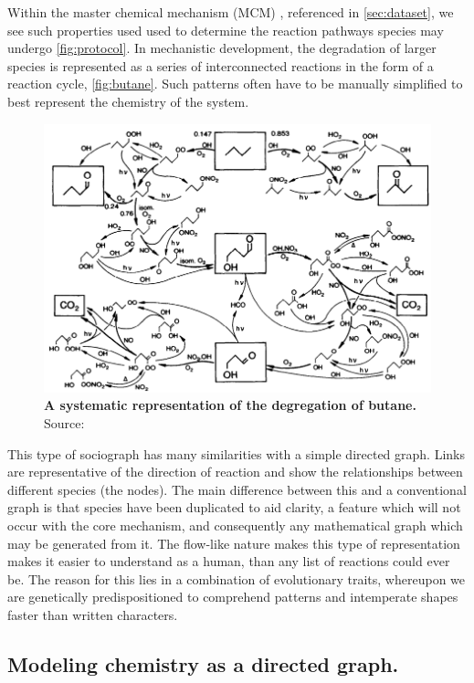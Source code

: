 Within the master chemical mechanism (MCM) \cite{mcm}, referenced in \autoref{sec:dataset}, we see such properties used used to determine the reaction pathways species may undergo \autoref{fig:protocol}. In mechanistic development, the degradation of larger species is represented as a series of interconnected reactions in the form of a reaction cycle, \autoref{fig:butane}. Such patterns often have to be manually simplified to best represent the chemistry of the system. 

\begin{figure}[H]
    \centering
        \includegraphics[width=\textwidth]{figures_c1/butane.png}

       \caption{\textbf{A systematic representation of the degregation of butane.} Source: \cite{butane} }
       \label{fig:butane}
\end{figure}

This type of sociograph has many similarities with a simple directed graph. Links are representative of the direction of reaction and show the relationships between different species (the nodes). The main difference between this and a conventional graph is that species have been duplicated to aid clarity, a feature which will not occur with the core mechanism, and consequently any mathematical graph which may be generated from it. The flow-like nature makes this type of representation makes it easier to understand as a human, than any list of reactions could ever be. The reason for this lies in a combination of evolutionary traits, whereupon we are genetically predispositioned to comprehend patterns and intemperate shapes faster than written characters. 


\subsection{Modeling chemistry as a directed graph.}

